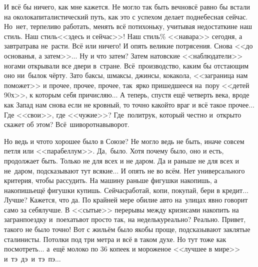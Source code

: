 И всё бы ничего, как мне кажется. Не могло так быть вечно\mdash всё равно бы встали на околокапиталистический путь, как это с успехом делает поднебесная сейчас. Но~нет, терпеливо работать, менять всё потихоньку, учитывая недостатки\mdash не наш стиль. Наш стиль\mdash <<здесь и сейчас>>! Наш стиль\% <<навара>> сегодня, а завтра\mdash трава не~расти. Всё или ничего! И опять великие потрясения. Снова <<до основанья, а затем>>$\ldots$ Ну и что затем? Затем натовские <<наблюдатели>> ногами открывали все двери в~стране. Всё~производство, каким бы отстающим оно ни~было\mdash к чёрту. Зато баксы, шмаксы, джинсы, кока\sdash кола, <<заграница нам поможет>> и прочее, прочее, прочее, так~ярко пришедшееся на~пору <<детей 90\sdash х>>, к которым себя причисляю$\ldots$ А теперь, спустя ещё четверть века, вроде как Запад нам снова если не кровный, то точно какой\sdash то враг и всё такое прочее$\ldots$ Где <<свои>>, где <<чужие>>? Где~политрук, который честно и~открыто скажет об этом? Всё~шиворот\sdash навыворот.

Но ведь и что\sdash то хорошее было в Союзе? Не могло ведь не быть, иначе совсем петля или <<парабеллум>>. Да,~было. Хотя почему было, оно и есть, продолжает быть. Только не для всех и не даром. Да и раньше не для всех и не~даром, подсказывают тут всякие$\ldots$
И опять не во всём. Нет универсального критерия, чтобы рассудить. На машину раньше фигушки накопишь, а накопишь\mdash ещё фигушки купишь. Сейчас\mdash работай, копи, покупай, бери в кредит$\ldots$ Лучше? Кажется, что да. По крайней мере обилие авто на~улицах явно говорит само за себя\mdash лучше. В <<сытые>> перерывы между кризисами накопить на загранпоездку и~поехать\mdash вот просто так, на недельку\mdash реально? Реально. Привет, такого не было точно! 
Вот с жильём было якобы проще, подсказывают заклятые сталинисты. Потолки под три метра и всё в таком духе. Но тут тоже как посмотреть$\ldots$ а~ещё молоко по 36 копеек и мороженое <<лучшее в мире>> и~тэ~дэ~и~тэ~пэ$\ldots$ 

